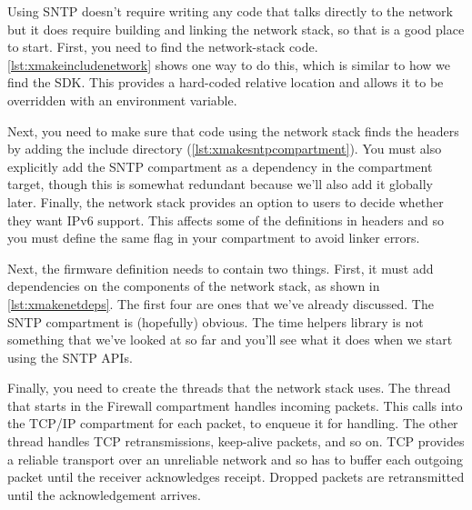 Using SNTP doesn't require writing any code that talks directly to the network but it does require building and linking the network stack, so that is a good place to start.
First, you need to find the network-stack code.
\ref{lst:xmakeincludenetwork} shows one way to do this, which is similar to how we find the SDK.
This provides a hard-coded relative location and allows it to be overridden with an environment variable.

\lualisting[filename=examples/sntp/xmake.lua,marker=include_network,label=lst:xmakeincludenetwork,caption="Build system code for including the network stack."]{}

Next, you need to make sure that code using the network stack finds the headers by adding the include directory (\ref{lst:xmakesntpcompartment}).
You must also explicitly add the SNTP compartment as a dependency in the compartment target, though this is somewhat redundant because we'll also add it globally later.
Finally, the network stack provides an option to users to decide whether they want IPv6 support.
This affects some of the definitions in headers and so you must define the same flag in your compartment to avoid linker errors.

\lualisting[filename=examples/sntp/xmake.lua,marker=sntp,label=lst:xmakesntpcompartment,caption="Build system code for building a compartment that uses the network stack."]{}

Next, the firmware definition needs to contain two things.
First, it must add dependencies on the components of the network stack, as shown in \ref{lst:xmakenetdeps}.
The first four are ones that we've already discussed.
The SNTP compartment is (hopefully) obvious.
The time helpers library is not something that we've looked at so far and you'll see what it does when we start using the SNTP APIs.

\lualisting[filename=examples/sntp/xmake.lua,marker=network_stack_deps,label=lst:xmakenetdeps,caption="Build system code for adding dependencies on the network stack."]{}

Finally, you need to create the threads that the network stack uses.
The thread that starts in the Firewall compartment handles incoming packets.
This calls into the TCP/IP compartment for each packet, to enqueue it for handling.
The other thread handles TCP retransmissions, keep-alive packets, and so on.
TCP provides a reliable transport over an unreliable network and so has to buffer each outgoing packet until the receiver acknowledges receipt.
Dropped packets are retransmitted until the acknowledgement arrives.

